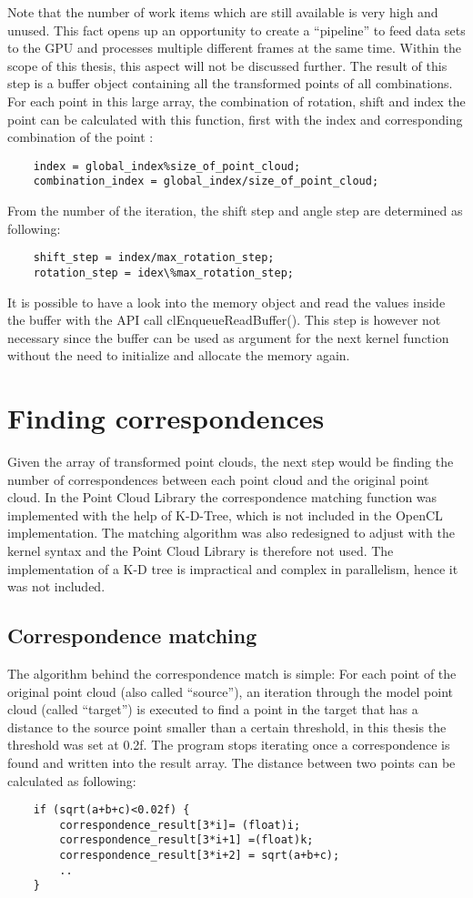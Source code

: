 Note that the number of work items which are still available is very high and unused. This fact opens up an opportunity to create a “pipeline” to feed data sets  to the GPU and processes multiple different frames at the same time. Within the scope of this thesis, this aspect will not be discussed further. 
The result of this step is a buffer object containing all the transformed points of all combinations. For each point in this large array, the combination  of rotation, shift and index the point can be calculated with this function, first with the index and corresponding combination of the point  :
\begin{lstlisting}
 	index = global_index%size_of_point_cloud;
 	combination_index = global_index/size_of_point_cloud;
\end{lstlisting}


From the number of the iteration, the shift step and angle step are determined as following:
\begin{lstlisting}
	shift_step = index/max_rotation_step;
    rotation_step = idex\%max_rotation_step;    
\end{lstlisting}    

    
It is possible to have a look into the memory object and read the values inside the buffer with the API call clEnqueueReadBuffer(). This step is however not necessary since the buffer can be used as argument for the next kernel function without the need to initialize and allocate the memory again. 
\newpage
\section{Finding correspondences}
Given the array of transformed point clouds, the next step would be finding the number of correspondences between each point cloud and the original point cloud. In the Point Cloud Library the correspondence matching function was implemented with the help of K-D-Tree, which is not included in the OpenCL implementation. The matching algorithm was also redesigned to adjust with the kernel syntax and the Point Cloud Library is therefore not used. The implementation of a K-D tree is impractical and complex in parallelism, hence it was not included.
\subsection{Correspondence matching}
The algorithm behind the correspondence match is simple: For each point of the original point cloud (also called “source”), an iteration through the model point cloud (called “target”) is executed to find a point in the target that has a distance to the source point smaller than a certain threshold, in this thesis the threshold was set at 0.2f. The program stops iterating once a correspondence is found and written into the result array. The distance between two points can be calculated as following:
\begin{lstlisting}
	if (sqrt(a+b+c)<0.02f) {       
        correspondence_result[3*i]= (float)i;
      	correspondence_result[3*i+1] =(float)k;
	    correspondence_result[3*i+2] = sqrt(a+b+c);
		..
    }
   
\end{lstlisting}  

